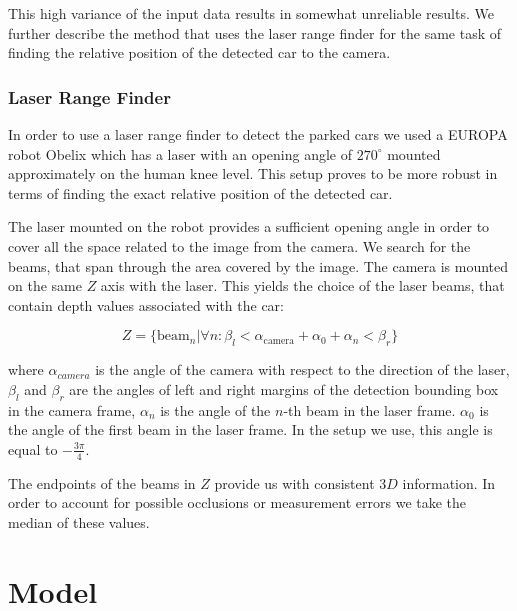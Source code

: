 This high variance of the input data results in somewhat unreliable results.
We further describe the method that uses the laser range finder for the same
task of finding the relative position of the detected car to the camera.

\subsubsection{Laser Range Finder}\label{ssub:laser_range_finder}

In order to use a laser range finder to detect the parked cars we used a
EUROPA robot Obelix which has a laser with an opening angle of $270^\circ$
mounted approximately on the human knee level. This setup proves to be more
robust in terms of finding the exact relative position of the detected car.

The laser mounted on the robot provides a sufficient opening angle in order to
cover all the space related to the image from the camera. We search for the
beams, that span through the area covered by the image. The camera is mounted
on the same $Z$ axis with the laser. This yields the choice of the laser
beams, that contain depth values associated with the car:

\begin{equation}
Z = \{ \mbox{beam}_n | \forall n : \beta_{l} < \alpha_{\mbox{camera}} + \alpha_{0} + \alpha_{n} < \beta_{r} \}
\end{equation}

where $\alpha_{camera}$ is the angle of the camera with respect to the
direction of the laser, $\beta_{l}$ and $\beta_{r}$ are the angles of left and
right margins of the detection bounding box in the camera frame, $\alpha_{n}$
is the angle of the $n$-th beam in the laser frame. $\alpha_{0}$ is the angle
of the first beam in the laser frame. In the setup we use, this angle is equal
to $-\frac{3\pi}{4}$.

The endpoints of the beams in $Z$ provide us with consistent $3D$ information.
In order to account for possible occlusions or measurement errors we take the
median of these values.


\section{Model} %
\label{sec:model}

